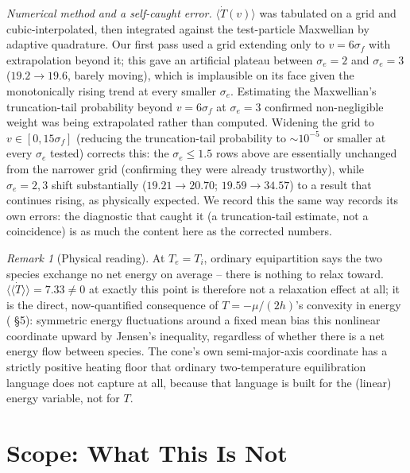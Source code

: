 \documentclass[12pt]{amsart}
\theoremstyle{plain}
\theoremstyle{remark}
\newtheorem*{remark}{Remark}
\begin{document}
\noindent\emph{Numerical method and a self-caught error.} $\langle\dot T(v)\rangle$ was tabulated on a grid and cubic-interpolated, then integrated against the test-particle Maxwellian by adaptive quadrature. Our first pass used a grid extending only to $v=6\sigma_f$ with extrapolation beyond it; this gave an artificial plateau between $\sigma_e=2$ and $\sigma_e=3$ ($19.2\to19.6$, barely moving), which is implausible on its face given the monotonically rising trend at every smaller $\sigma_e$. Estimating the Maxwellian's truncation-tail probability beyond $v=6\sigma_f$ at $\sigma_e=3$ confirmed non-negligible weight was being extrapolated rather than computed. Widening the grid to $v\in[0,15\sigma_f]$ (reducing the truncation-tail probability to $\sim\!10^{-5}$ or smaller at every $\sigma_e$ tested) corrects this: the $\sigma_e\le1.5$ rows above are essentially unchanged from the narrower grid (confirming they were already trustworthy), while $\sigma_e=2,3$ shift substantially ($19.21\to20.70$; $19.59\to34.57$) to a result that continues rising, as physically expected. We record this the same way \cite{EbertBath2026} records its own errors: the diagnostic that caught it (a truncation-tail estimate, not a coincidence) is as much the content here as the corrected numbers.

\begin{remark}[Physical reading]
At $T_e=T_i$, ordinary equipartition says the two species exchange no net energy on average -- there is nothing to relax toward. $\langle\langle\dot T\rangle\rangle=7.33\neq0$ at exactly this point is therefore not a relaxation effect at all; it is the direct, now-quantified consequence of $T=-\mu/(2h)$'s convexity in energy (\cite{EbertBath2026} \S5): symmetric energy fluctuations around a fixed mean bias this nonlinear coordinate upward by Jensen's inequality, regardless of whether there is a net energy flow between species. The cone's own semi-major-axis coordinate has a strictly positive heating floor that ordinary two-temperature equilibration language does not capture at all, because that language is built for the (linear) energy variable, not for $T$.
\end{remark}

\section{Scope: What This Is Not}
\end{document}
